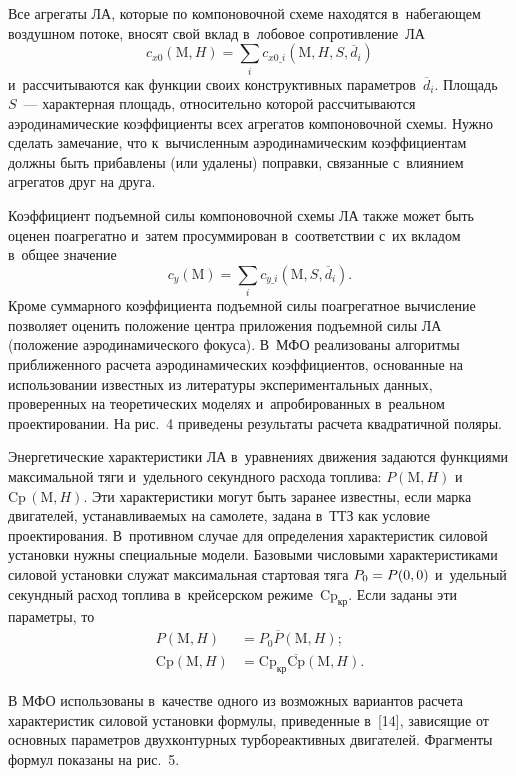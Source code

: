 \begin{multicols}{2}
    Все агрегаты ЛА, которые по компоновочной схеме находятся 
в~набегающем воздушном потоке, вносят свой вклад в~лобовое сопротивление~ЛА 
$$
c_{x0}(\mathrm{M},H)= \sum\limits_i c_{x0\_i}(\mathrm{M},H,S,\overline{d}_i)
$$ 
и~рассчитываются как функции своих конструктивных 
па\-ра\-мет\-ров~$\overline{d}_i$. Площадь~$S$~--- характерная площадь, 
относительно которой рассчитываются аэродинамические коэффициенты всех 
агрегатов компоновочной схемы. Нужно сделать замечание, что к~вы\-чис\-лен\-ным 
аэродинамическим коэффициентам должны быть при\-бав\-ле\-ны (или удалены) 
поправки, связанные с~влиянием агрегатов друг на друга. 



  
  Коэффициент подъемной силы компоновочной схемы ЛА также может быть 
оценен поагрегатно и~затем просуммирован в~соответствии с~их вкладом 
в~общее значение 
$$
c_y(\mathrm{M})= \sum\limits_i c_{y\_i}\left(\mathrm{M},S,\overline{d}_i\right).
$$ 
Кроме суммарного коэффициента подъемной силы поагрегатное вычисление 
поз\-во\-ля\-ет оценить положение цент\-ра приложения подъемной силы ЛА 
(\mbox{положение} аэродинамического фокуса). В~МФО реализованы алгоритмы 
приближенного расчета аэродинамических коэффициентов, основанные на 
использовании известных из литературы экспериментальных данных, 
проверенных на тео\-ре\-ти\-че\-ских моделях и~апробированных в~реальном 
проектировании. На рис.~4 приведены результаты расчета квад\-ра\-тич\-ной 
по\-ляры.
  


  Энергетические характеристики ЛА в~уравнениях движения задаются 
функциями максимальной тяги и~удельного секундного расхода топлива: 
$P(\mathrm{M},H)$ и~$\mathrm{Cp}\,(\mathrm{M},H)$. Эти характеристики могут быть заранее известны, если 
марка двигателей, уста\-нав\-ли\-ва\-емых на самолете, задана в~ТТЗ как условие 
проектирования. В~противном случае для определения характеристик силовой 
установки нужны специальные модели. Базовыми чис\-ло\-вы\-ми 
характеристиками силовой установки служат максимальная стартовая тяга 
$P_0\hm= P(0,0)$ и~удельный секундный расход топ\-ли\-ва в~крейсерском 
режиме~$\mathrm{Cp}_{\mathrm{кр}}$. Если заданы эти па\-ра\-мет\-ры, то
\begin{align*}
  P(\mathrm{M},H)&=P_0\overline{P}(\mathrm{M},H);\\
\mathrm{Cp}(\mathrm{M}, H)&=\mathrm{Cp}_{\mathrm{кр}}\overline{\mathrm{Cp}}(\mathrm{M},H).
  \end{align*}
  
  В МФО использованы в~качестве одного из возможных вариантов расчета 
характеристик силовой установки формулы, приведенные в~[14], зависящие от 
основных параметров двухконтурных турбореактивных двигателей. Фрагменты 
формул показаны на рис.~5.
  

\end{multicols}
